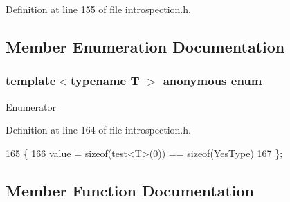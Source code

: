 Definition at line 155 of file introspection.\+h.



\subsection{Member Enumeration Documentation}
\subsubsection[{\texorpdfstring{anonymous enum}{anonymous enum}}]{\setlength{\rightskip}{0pt plus 5cm}template$<$typename T $>$ anonymous enum}\hypertarget{classsmacc_1_1HasAutomaticTransitionType_af7c2dd6009f2a3464a9b253b5eabe8e5}{}\label{classsmacc_1_1HasAutomaticTransitionType_af7c2dd6009f2a3464a9b253b5eabe8e5}
\begin{Desc}
\item[Enumerator]\par
\begin{description}
\item[{\em 
value\hypertarget{classsmacc_1_1HasAutomaticTransitionType_af7c2dd6009f2a3464a9b253b5eabe8e5ac3dba7514caf15e85491ccfd880b108b}{}\label{classsmacc_1_1HasAutomaticTransitionType_af7c2dd6009f2a3464a9b253b5eabe8e5ac3dba7514caf15e85491ccfd880b108b}
}]\end{description}
\end{Desc}


Definition at line 164 of file introspection.\+h.


\begin{DoxyCode}
165     \{
166         \hyperlink{classsmacc_1_1HasAutomaticTransitionType_af7c2dd6009f2a3464a9b253b5eabe8e5ac3dba7514caf15e85491ccfd880b108b}{value} = \textcolor{keyword}{sizeof}(test<T>(0)) == \textcolor{keyword}{sizeof}(\hyperlink{classsmacc_1_1HasAutomaticTransitionType_a0261cbc759cb52b6f60495d327a088a4}{YesType})
167     \};
\end{DoxyCode}


\subsection{Member Function Documentation}
